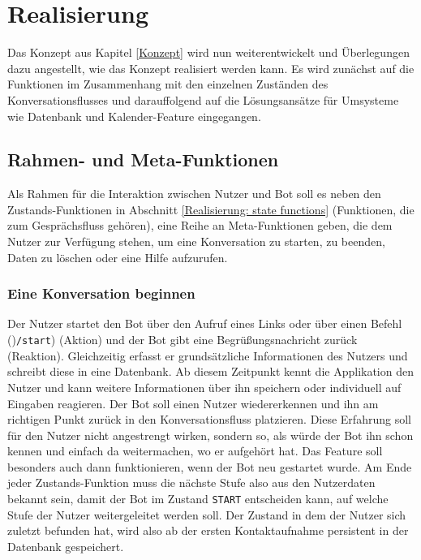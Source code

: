 \chapter{Realisierung} \label{Realisierung}

    Das Konzept aus Kapitel \ref*{Konzept} wird nun weiterentwickelt und Überlegungen dazu angestellt, wie das Konzept realisiert werden kann. Es wird zunächst auf die Funktionen im Zusammenhang mit den einzelnen Zuständen des Konversationsflusses und darauffolgend auf die Lösungsansätze für Umsysteme wie Datenbank und Kalender-Feature eingegangen.

    
    \section{Rahmen- und Meta-Funktionen} \label{Realisierung: meta functions}
        Als Rahmen für die Interaktion zwischen Nutzer und Bot soll es neben den Zustands-Funktionen in Abschnitt \ref*{Realisierung: state functions} (Funktionen, die zum Gesprächsfluss gehören), eine Reihe an Meta-Funktionen geben, die dem Nutzer zur Verfügung stehen, um eine Konversation zu starten, zu beenden, Daten zu löschen oder eine Hilfe aufzurufen.
            
        \subsection{Eine Konversation beginnen}
            Der Nutzer startet den Bot über den Aufruf eines Links oder über einen Befehl ()\verb|/start|) (Aktion) und der Bot gibt eine Begrüßungsnachricht zurück (Reaktion). Gleichzeitig erfasst er grundsätzliche Informationen des Nutzers und schreibt diese in eine Datenbank. Ab diesem Zeitpunkt kennt die Applikation den Nutzer und kann weitere Informationen über ihn speichern oder individuell auf Eingaben reagieren. Der Bot soll einen Nutzer wiedererkennen und ihn am richtigen Punkt zurück in den Konversationsfluss platzieren. Diese Erfahrung soll für den Nutzer nicht angestrengt wirken, sondern so, als würde der Bot ihn schon kennen und einfach da weitermachen, wo er aufgehört hat. Das Feature soll besonders auch dann funktionieren, wenn der Bot neu gestartet wurde. Am Ende jeder Zustands-Funktion muss die nächste Stufe also aus den Nutzerdaten bekannt sein, damit der Bot im Zustand \verb|START| entscheiden kann, auf welche Stufe der Nutzer weitergeleitet werden soll. Der Zustand in dem der Nutzer sich zuletzt befunden hat, wird also ab der ersten Kontaktaufnahme persistent in der Datenbank gespeichert.
        
